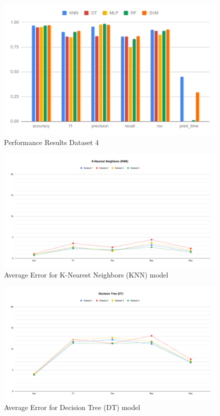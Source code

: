 {    \begin{figure}[ht]
        \centering
        \includegraphics[width=1.9\columnwidth]{media/ch_result_and_testing/perf_ds_4.pdf}
        \caption{Performance Results Dataset 4} \label{fig:perfromance_results_dataset_4}
    \end{figure}

    \begin{figure}[ht]
        \centering
        \includegraphics[width=1.9\columnwidth]{media/ch_result_and_testing/delta_KNN.pdf}
        \caption{Average Error for K-Nearest Neighbors (KNN) model} \label{fig:perfromance_delta_knn}
    \end{figure}

    \begin{figure}[ht]
        \centering
        \includegraphics[width=1.9\columnwidth]{media/ch_result_and_testing/delta_DT.pdf}
        \caption{Average Error for Decision Tree (DT) model} \label{fig:perfromance_delta_dt}
    \end{figure}

}
